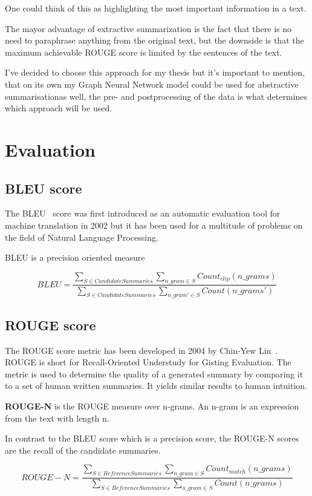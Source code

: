 One could think of this as highlighting the most important information in a text.

The mayor advantage of extractive summarization is the fact that there is no need to paraphrase anything from the original text, but the downside is that the maximum achievable ROUGE score is limited by the sentences of the text.

I've decided to choose this approach for my thesis but it's important to mention, that on its own my Graph Neural Network model could be used for abstractive summarisationas well, the pre- and postprocessing of the data is what determines which approach will be used.

\section{Evaluation}
\subsection{BLEU score}
The BLEU~\cite{BLEU} score was first introduced as an automatic evaluation tool for machine translation in 2002 but it has been used for a multitude of problems on the field of Natural Language Processing.

BLEU is a precision oriented measure

\[BLEU = \frac{\sum_{S \in CandidateSummaries}\sum_{n\_gram \in S} Count_{clip} (n\_grams)}{\sum_{S \in CandidateSummaries}\sum_{n\_gram' \in S} Count(n\_grams')}\]

\subsection{ROUGE score}
The ROUGE score metric has been developed in 2004 by Chin-Yew Lin~\cite{ROUGE}. ROUGE is short for Recall-Oriented Understudy for Gisting Evaluation. The metric is used to determine the quality of a generated summary by comparing it to a set of human written summaries. It yields similar results to human intuition.

\textbf{ROUGE-N} is the ROUGE measure over n-grams. An n-gram is an expression from the text with length n.

In contrast to the BLEU score which is a precision score, the ROUGE-N scores are the recall of the candidate summaries.

\[ROUGE-N = \frac{\sum_{S \in ReferenceSummaries}\sum_{n\_gram \in S} Count_{match} (n\_grams)}{\sum_{S \in ReferenceSummaries}\sum_{n\_gram \in S} Count(n\_grams)}\]

